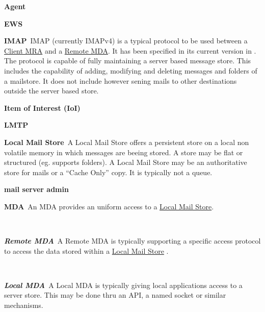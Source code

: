 \documentclass[a4paper,appendixprefix,pdfusetitle,twocolumn,draft,8pt]{scrbook}
\newenvironment{entry}{\par\leavevmode\hangpara{1.5mm}{1}\ignorespaces}{\RaggedRight\par}
\newcommand*{\mainentry}[2]{{\bfseries{#1\label{def:#1}}}~#2\par}
\newcommand*{\subentry}[2]{\par~\begin{minipage}{\columnwidth-0.6cm}{\bfseries{\itshape{#1\label{def:#1}}}}~#2\end{minipage}}
\newcommand*{\defref}[1]{\hyperref[def:#1]{#1}}
\begin{document}
\begin{entry}
  \mainentry{Agent}{}
\end{entry}

\begin{entry}
  \mainentry{EWS}{\fxfatal{add content here}}
\end{entry}

\begin{entry}
  \mainentry{IMAP}{IMAP (currently IMAPv4) is a typical protocol to be used between a \defref{Client MRA} and a \defref{Remote MDA}. It has been specified in its current version in \cite{RFC3501}. The protocol is capable of fully maintaining a server based message store. This includes the capability of adding, modifying and deleting messages and folders of a mailstore. It does not include however sening mails to other destinations outside the server based store.}
\end{entry}

\begin{entry}
	\mainentry{Item of Interest (IoI)}{}
\end{entry}

\begin{entry}
  \mainentry{LMTP}{\fxfatal{add content here}}
\end{entry}

\begin{entry}
  \mainentry{Local Mail Store}{A Local Mail Store offers a persistent store on a local non volatile memory in which messages are beeing stored. A store may be flat or structured (eg. supports folders). A Local Mail Store may be an authoritative store for mails or a ``Cache Only'' copy. It is typically not a queue.}
\end{entry}

\begin{entry}
  \mainentry{mail server admin}{}
\end{entry}

\begin{entry}
  \mainentry{MDA}{An MDA provides an uniform access to a \defref{Local Mail Store}.}
  \subentry{Remote MDA}{A Remote MDA is typically supporting a specific access protocol to access the data stored within a \defref{Local Mail Store} .}
  \subentry{Local MDA}{A Local MDA is typically giving local applications access to a server store. This may be done thru an API, a named socket or similar mechanisms.}
\end{entry}
\end{document}
